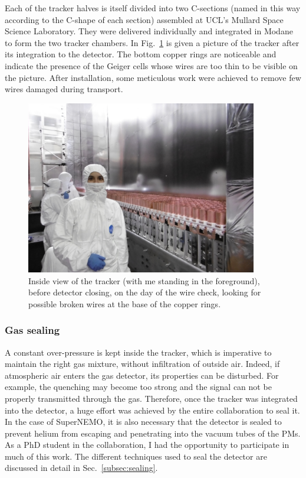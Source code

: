 Each of the tracker halves is itself divided into two C-sections (named in this way according to the C-shape of each section) assembled at UCL’s Mullard Space Science Laboratory.
They were delivered individually and integrated in Modane to form the two tracker chambers.
In Fig.~\ref{fig:me_tracker} is given a picture of the tracker after its integration to the detector.
The bottom copper rings are noticeable and indicate the presence of the Geiger cells whose wires are too thin to be visible on the picture.
After installation, some meticulous work were achieved to remove few wires damaged during transport.
\begin{figure}[h!]
\centering
\includegraphics[width=0.9\textwidth]{SNdemonstrator/fig_SNdemonstrator/tracker_selfie.jpg}
\caption{Inside view of the tracker (with me standing in the foreground), before detector closing, on the day of the wire check, looking for possible broken wires at the base of the copper rings.
\label{fig:me_tracker}}
\end{figure}

\subsubsection*{Gas sealing}

A constant over-pressure is kept inside the tracker, which is imperative to maintain the right gas mixture, without infiltration of outside air.
Indeed, if atmospheric air enters the gas detector, its properties can be disturbed.
For example, the quenching may become too strong and the signal can not be properly transmitted through the gas.
Therefore, once the tracker was integrated into the detector, a huge effort was achieved by the entire collaboration to seal it.
In the case of SuperNEMO, it is also necessary that the detector is sealed to prevent helium from escaping and penetrating into the vacuum tubes of the PMs.
As a PhD student in the collaboration, I had the opportunity to participate in much of this work.
The different techniques used to seal the detector are discussed in detail in Sec.~\ref{subsec:sealing}.

